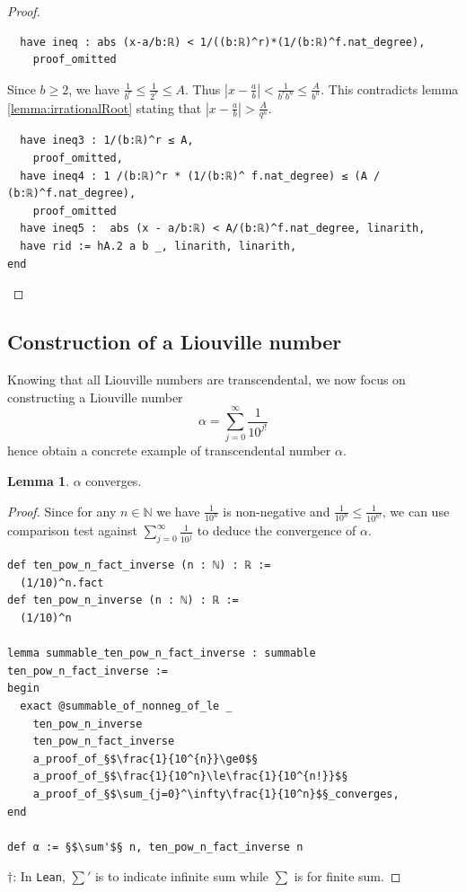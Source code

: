 \documentclass{report}
\theoremstyle{definition}
\newtheorem{lemma}{Lemma}[section]
\begin{document}
\begin{proof}
\begin{verbatim}
  have ineq : abs (x-a/b:ℝ) < 1/((b:ℝ)^r)*(1/(b:ℝ)^f.nat_degree),
    proof_omitted
\end{verbatim}

Since $b\ge 2$, we have $\frac1{b^r}\le\frac1{2^r}\le A$. Thus $\left|x-\frac a b\right|<\frac1{b^r b^n}\le \frac A{b^n}$. This contradicts lemma \ref{lemma:irrationalRoot} stating that $\left|x-\frac a b\right|>\frac{A}{q^n}$.
\begin{verbatim} 
  have ineq3 : 1/(b:ℝ)^r ≤ A,
    proof_omitted,
  have ineq4 : 1 /(b:ℝ)^r * (1/(b:ℝ)^ f.nat_degree) ≤ (A / (b:ℝ)^f.nat_degree),
    proof_omitted
  have ineq5 :  abs (x - a/b:ℝ) < A/(b:ℝ)^f.nat_degree, linarith,
  have rid := hA.2 a b _, linarith, linarith,
end
\end{verbatim}
\end{proof}

\subsection*{Construction of a Liouville number}

Knowing that all Liouville numbers are transcendental, we now focus on constructing a Liouville number $$\alpha=\sum_{j=0}^\infty \frac1{10^{j!}}$$hence obtain a concrete example of transcendental number $\alpha$.

\begin{lemma}
$\alpha$ converges.
\end{lemma}

\begin{proof}
Since for any $n\in\mathbb N$ we have $\frac 1{10^{n}}$ is non-negative and $\frac1{10^n}\le\frac1{10^{n!}}$, we can use comparison test against $\sum_{j=0}^\infty\frac1{10^j}$ to deduce the convergence of $\alpha$.

\begin{verbatim}
def ten_pow_n_fact_inverse (n : ℕ) : ℝ := 
  (1/10)^n.fact
def ten_pow_n_inverse (n : ℕ) : ℝ := 
  (1/10)^n

lemma summable_ten_pow_n_fact_inverse : summable ten_pow_n_fact_inverse :=
begin
  exact @summable_of_nonneg_of_le _ 
    ten_pow_n_inverse 
    ten_pow_n_fact_inverse 
    a_proof_of_§$\frac{1}{10^{n}}\ge0$§
    a_proof_of_§$\frac{1}{10^n}\le\frac{1}{10^{n!}}$§
    a_proof_of_§$\sum_{j=0}^\infty\frac{1}{10^n}$§_converges,
end

def α := §$\sum'$§ n, ten_pow_n_fact_inverse n
\end{verbatim}
$\dagger$: In {\tt \small Lean}, $\sum'$ is to indicate infinite sum while $\sum$ is for finite sum.
\end{proof}
\end{document}
